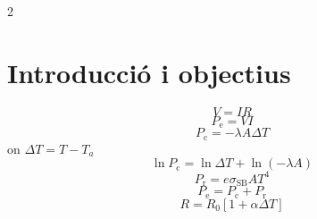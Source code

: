 \documentclass[12pt,twosides,onecolumn,openany]{article}
\begin{document}
\begin{multicols}{2}
\section{Introducció i objectius}
\begin{equation}\label{Llei_Ohm}
  V =IR
\end{equation}
\begin{equation}\label{Pot_elec}
  P_{\text{e}} = VI
\end{equation}
\begin{equation}\label{Newton}
  P_{\text{c}} = -\lambda A\Delta T
\end{equation}
on $\Delta T = T - T_a$ 
\begin{equation}\label{ln_Newton}
  \ln{P_{\text{c}}} = \ln{\Delta T} + \ln{(-\lambda A)}
\end{equation}
\begin{equation}\label{Stefan_Boltzmann}
  P_{\text{r}} = e\sigma_{\text{SB}}AT^{4}
\end{equation}
\begin{equation}\label{relacions_pot}
  P_{\text{e}}=P_{\text{c}} + P_{\text{r}}
\end{equation}
\begin{equation}\label{resistencia}
  R = R_0[1+\alpha\Delta T]
\end{equation}

\end{multicols}
\end{document}

